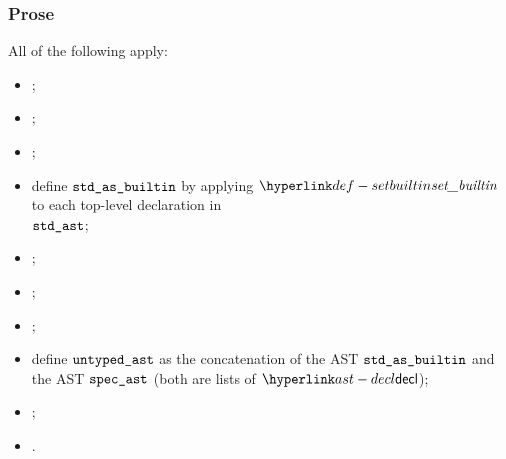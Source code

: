 \subsubsection{Prose}
All of the following apply:
\begin{itemize}
    \item \Proseaslscan{$\vstdtext$}{$\spectoken$}{$\vstdtokens$\ProseTerminateAs{\LexicalError}};
    \item \Proseaslparse{$\vstdtokens$}{$\vstdparse$\ProseTerminateAs{\ParseError}};
    \item \Prosebuildast{$\vstdparse$}{$\vstdast$\ProseTerminateAs{\BuildErrorConfig}};
    \item define $\texttt{std\_as\_builtin}$ by applying $\setbuiltin$ to each top-level declaration in\\
          $\vstdast$\ProseOrTypeError;
    \item \Proseaslscan{$\vspectext$}{$\spectoken$}{$\vspectokens$\ProseTerminateAs{\LexicalError}};
    \item \Proseaslparse{$\vspectokens$}{$\vspecparse$\ProseTerminateAs{\ParseError}};
    \item \Prosebuildast{$\vspecparse$}{$\vspecast$\ProseTerminateAs{\BuildErrorConfig}};
    \item define $\texttt{untyped\_ast}$ as the concatenation of the AST $\texttt{std\_as\_builtin}$ and
          the AST $\vspecast$ (both are lists of $\decl$);
    \item {};
    \item {}.
\end{itemize}

